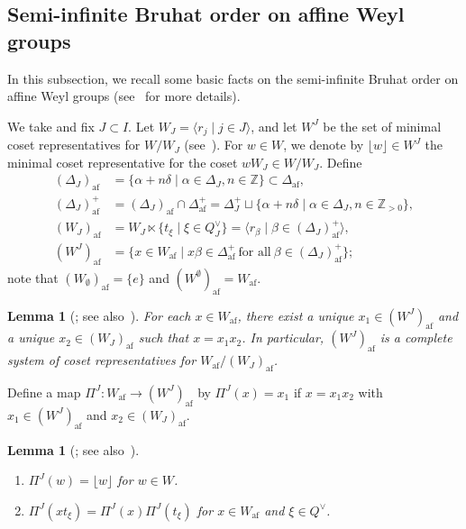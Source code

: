 \documentclass[10pt]{amsart}
\newtheorem{lemm}[theo]{Lemma}
\theoremstyle{definition}\newtheorem{defi}[theo]{Definition}
\theoremstyle{remark}\newtheorem{rema}[theo]{Remark}
\newcommand{\BZ}{\mathbb{Z}}
\DeclareMathOperator{\af}{af}
\begin{document}
\subsection{Semi-infinite Bruhat order on affine Weyl groups} \label{Subsection:SiBO}

In this subsection, 
we recall some basic facts on 
the semi-infinite Bruhat order on affine Weyl groups 
(see~\cite{INS16,LS,P} for more details).

We take and fix $J \subset I$. 
Let $W_J = \langle r_j \mid j \in J \rangle$, 
and let 
$W^J$
be the set of minimal coset representatives for $W/W_J$ 
(see~\cite[Corollary~2.4.5~(i)]{BB}). 
For 
$w \in W$, 
we denote by 
$\lfloor w \rfloor \in W^J$ 
the minimal coset representative for the coset 
$wW_J \in W/W_J$.
Define
{
\begin{align}
(\Delta_J)_{\af} 
&=
\{ \alpha + n\delta \mid \alpha \in \Delta_J , n \in \BZ \} \subset \Delta_{\af}, \\%
(\Delta_J)_{\af}^+ 
&=
(\Delta_J)_{\af} \cap \Delta_{\af}^+ 
=
\Delta_J^+ 
\sqcup
\{ \alpha + n\delta \mid \alpha \in \Delta_J , n \in \BZ_{>0} \}, \\%
(W_J)_{\af}
&=
W_J \ltimes \{ t_{\xi} \mid \xi \in Q_J^{\vee} \}
=
\langle r_{\beta} \mid \beta \in (\Delta_J)_{\af}^+ \rangle , \label{eq:W_J_af} \\%
(W^J)_{\af} 
&=
\{ x \in W_{\af} \mid x\beta \in \Delta_{\af}^+ \ \text{for all} \ \beta \in (\Delta_J)_{\af}^+ \} ;
\end{align}}%
note that 
$(W_{\emptyset})_{\af} = \{ e \}$ 
and 
$(W^{\emptyset})_{\af} = W_{\af}$.

\begin{lemm}[{\cite{P}; see also~\cite[Lemma~10.5]{LS}}] \label{lem:Waf-decomp}
For each $x \in W_{\af}$, 
there exist a unique $x_1 \in (W^J)_{\af}$
and a unique $x_2 \in (W_J)_{\af}$ such that
$x = x_1 x_2$. 
In particular, 
$(W^J)_{\af}$ 
is a complete system of coset representatives for 
$W_{\af} / (W_J)_{\af}$. 
\end{lemm}

Define a map 
$\Pi^J : W_{\af} \rightarrow (W^J)_{\af}$ 
by $\Pi^J(x) = x_1$ 
if $x = x_1 x_2$ with 
$x_1 \in (W^J)_{\af}$
and 
$x_2 \in (W_J)_{\af}$. 

\begin{lemm}[{\cite{P}; see also~\cite[Proposition~10.8]{LS}}] \label{lem:Pi}\ \\[-1.2em]

\begin{enumerate}[label=(\arabic*)]
\item\label{Lemm2.3_1}
$\Pi^J(w) = \lfloor w \rfloor$ 
for $w \in W$.
\item \label{Lemm2.3_2}
$\Pi^J(x t_{\xi}) = \Pi^J(x) \Pi^J(t_{\xi})$
for $x \in W_{\af}$ and $\xi \in Q^{\vee}$.
\end{enumerate}
\end{lemm}
\end{document}
